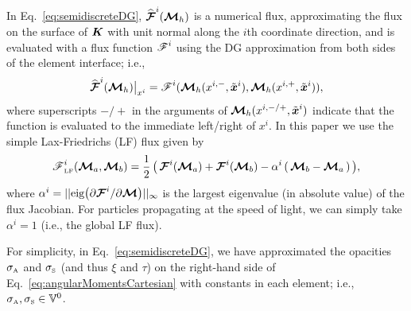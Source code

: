 In Eq.~\eqref{eq:semidiscreteDG}, $\widehat{\boldsymbol{\mathcal{F}}}^{i}(\boldsymbol{\mathcal{M}}_{h})$ is a numerical flux, approximating the flux on the surface of $\boldsymbol{K}$ with unit normal along the $i$th coordinate direction, and is evaluated with a flux function $\boldsymbol{\mathscr{F}}^{i}$ using the DG approximation from both sides of the element interface; i.e.,
\begin{equation}
  \widehat{\boldsymbol{\mathcal{F}}}^{i}(\boldsymbol{\mathcal{M}}_{h})\big|_{x^{i}}=\boldsymbol{\mathscr{F}}^{i}(\boldsymbol{\mathcal{M}}_{h}(x^{i,-},\tilde{\boldsymbol{x}}^{i}),\boldsymbol{\mathcal{M}}_{h}(x^{i,+},\tilde{\boldsymbol{x}}^{i})),
\end{equation}
where superscripts $-/+$ in the arguments of $\boldsymbol{\mathcal{M}}_{h}(x^{i,-/+},\tilde{\boldsymbol{x}}^{i})$ indicate that the function is evaluated to the immediate left/right of $x^{i}$.  
In this paper we use the simple Lax-Friedrichs (LF) flux given by
\begin{equation}
  \boldsymbol{\mathscr{F}}_{\mbox{\tiny LF}}^{i}(\boldsymbol{\mathcal{M}}_{a},\boldsymbol{\mathcal{M}}_{b})
  =\frac{1}{2}\,\big(\,\boldsymbol{\mathcal{F}}^{i}(\boldsymbol{\mathcal{M}}_{a})+\boldsymbol{\mathcal{F}}^{i}(\boldsymbol{\mathcal{M}}_{b})-\alpha^{i}\,(\,\boldsymbol{\mathcal{M}}_{b}-\boldsymbol{\mathcal{M}}_{a}\,)\,\big),
  \label{eq:fluxFunctionLF}
\end{equation}
where $\alpha^{i}=||\mbox{eig}\big(\partial\boldsymbol{\mathcal{F}}^{i}/\partial\boldsymbol{\mathcal{M}}\big)||_{\infty}$ is the largest eigenvalue (in absolute value) of the flux Jacobian.  
For particles propagating at the speed of light, we can simply take $\alpha^{i}=1$ (i.e., the global LF flux).  

\begin{rem}
For simplicity, in Eq.~\eqref{eq:semidiscreteDG}, we have approximated the opacities $\sigma_{\mbox{\tiny A}}$ and $\sigma_{\mbox{\tiny S}}$ (and thus $\xi$ and $\tau$) on the right-hand side of Eq.~\eqref{eq:angularMomentsCartesian} with constants in each element; i.e., $\sigma_{\mbox{\tiny A}},\sigma_{\mbox{\tiny S}}\in\mathbb{V}^{0}$.  
\end{rem}